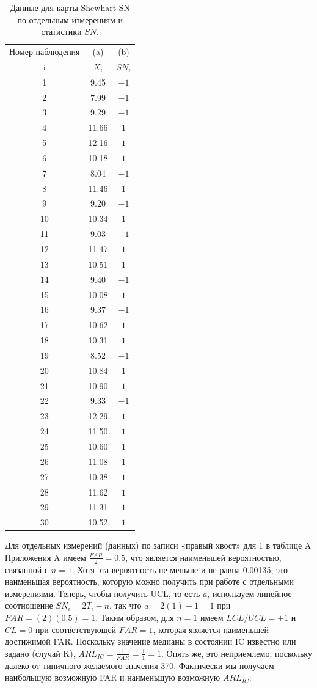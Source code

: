 \begin{table}[!ht]
	\centering
	\caption{Данные для карты Shewhart-SN по отдельным измерениям и статистики \(SN\).}
	\label{tab:4.5}
	\begin{tabular}{@{}ccc@{}}\toprule
		Номер наблюдения & (a) & (b) \\ i & \(X_i\) & \(SN_i\) \\ \midrule
		1 & 9.45 & \(-1\) \\ 2 & 7.99 & \(-1\) \\ 3 & 9.29 & \(-1\) \\ 4 & 11.66 & \(1\) \\
		5 & 12.16 & \(1\) \\ 6 & 10.18 & \(1\) \\ 7 & 8.04 & \(-1\) \\ 8 & 11.46 & \(1\) \\
		9 & 9.20 & \(-1\) \\ 10 & 10.34 & \(1\) \\ 11 & 9.03 & \(-1\) \\ 12 & 11.47 & \(1\) \\
		13 & 10.51 & \(1\) \\ 14 & 9.40 & \(-1\) \\ 15 & 10.08 & \(1\) \\ 16 & 9.37 & \(-1\) \\
		17 & 10.62 & \(1\) \\ 18 & 10.31 & \(1\) \\ 19 & 8.52 & \(-1\) \\ 20 & 10.84 & \(1\) \\
		21 & 10.90 & \(1\) \\ 22 & 9.33 & \(-1\) \\ 23 & 12.29 & \(1\) \\ 24 & 11.50 & \(1\) \\
		25 & 10.60 & \(1\) \\ 26 & 11.08 & \(1\) \\ 27 & 10.38 & \(1\) \\ 28 & 11.62 & \(1\) \\
		29 & 11.31 & \(1\) \\ 30 & 10.52 & \(1\) \\ \bottomrule
	\end{tabular}
\end{table}

Для отдельных измерений (данных) по записи «правый хвост» для 1 в таблице A Приложения A имеем \(\frac{FAR}{2} = 0.5\), что является наименьшей вероятностью, связанной с \(n = 1\). Хотя эта вероятность не меньше и не равна 0.00135, это наименьшая вероятность, которую можно получить при работе с отдельными измерениями. Теперь, чтобы получить UCL, то есть \(a\), используем линейное соотношение \(SN_i = 2T_i - n\), так что \(a = 2(1) - 1 = 1\) при \(FAR = (2)(0.5) = 1\). Таким образом, для \(n = 1\) имеем \(LCL / UCL = \pm 1\) и \(CL = 0\) при соответствующей \(FAR = 1\), которая является наименьшей достижимой FAR. Поскольку значение медианы в состоянии IC известно или задано (случай K), \(ARL_{IC} = \frac{1}{FAR} = \frac{1}{1} = 1\). Опять же, это неприемлемо, поскольку далеко от типичного желаемого значения 370. Фактически мы получаем наибольшую возможную FAR и наименьшую возможную \(ARL_{IC}\).


